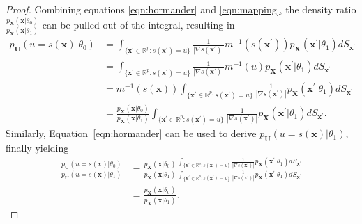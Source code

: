 \documentclass[12pt]{article}
\numberwithin{equation}{section}
\theoremstyle{plain}
\begin{document}
\begin{proof}
Combining equations \ref{eqn:hormander} and \ref{eqn:mapping}, the density ratio $\frac{p_\mathbf{X}(\mathbf{x}|\theta_0)}{p_\mathbf{X}(\mathbf{x}|\theta_1)}$ can be pulled out of the integral, resulting in
\begin{align}
p_{\mathbf{U}}(u=s(\mathbf{x})|\theta_0) &= \int_{\{\mathbf{x}^\prime \in \mathbb{R}^p : s(\mathbf{x}^\prime) = u\}}  \frac{1}{|\nabla s(\mathbf{x}^\prime)|} m^{-1}(s(\mathbf{x}^\prime)) p_\mathbf{X}(\mathbf{x}^\prime|\theta_1) dS_{\mathbf{x}^\prime} \nonumber \\
&= \int_{\{\mathbf{x}^\prime \in \mathbb{R}^p : s(\mathbf{x}^\prime) = u\}}  \frac{1}{|\nabla s(\mathbf{x}^\prime)|} m^{-1}(u) p_\mathbf{X}(\mathbf{x}^\prime|\theta_1) dS_{\mathbf{x}^\prime} \nonumber \\
&= m^{-1}(s(\mathbf{x})) \int_{\{\mathbf{x}^\prime \in \mathbb{R}^p : s(\mathbf{x}^\prime) = u\}}  \frac{1}{|\nabla s(\mathbf{x}^\prime)|}  p_\mathbf{X}(\mathbf{x}^\prime|\theta_1) dS_{\mathbf{x}^\prime} \nonumber \\
&= \frac{p_\mathbf{X}(\mathbf{x}|\theta_0)}{p_\mathbf{X}(\mathbf{x}|\theta_1)} \int_{\{\mathbf{x}^\prime \in \mathbb{R}^p : s(\mathbf{x}^\prime) = u\}}  \frac{1}{|\nabla s(\mathbf{x}^\prime)|}  p_\mathbf{X}(\mathbf{x}^\prime|\theta_1) dS_{\mathbf{x}^\prime}. \label{eqn:factorization}
\end{align}
Similarly, Equation~\ref{eqn:hormander} can be used to derive $p_{\mathbf{U}}(u=s(\mathbf{x})|\theta_1)$, finally yielding
\begin{align}
\frac{p_{\mathbf{U}}(u=s(\mathbf{x})|\theta_0)}{p_{\mathbf{U}}(u=s(\mathbf{x})|\theta_1)} &= \frac{p_\mathbf{X}(\mathbf{x}|\theta_0)}{p_\mathbf{X}(\mathbf{x}|\theta_1)} \frac{\int_{\{\mathbf{x}^\prime \in \mathbb{R}^p : s(\mathbf{x}^\prime) = u\}}  \frac{1}{|\nabla s(\mathbf{x}^\prime)|}  p_\mathbf{X}(\mathbf{x}^\prime|\theta_1) dS_{\mathbf{x}^\prime}}{ \int_{\{\mathbf{x}^\prime \in \mathbb{R}^p : s(\mathbf{x}^\prime) = u\}}  \frac{1}{|\nabla s(\mathbf{x}^\prime)|}  p_\mathbf{X}(\mathbf{x}^\prime|\theta_1) dS_{\mathbf{x}^\prime} } \nonumber \\
&= \frac{p_\mathbf{X}(\mathbf{x}|\theta_0)}{p_\mathbf{X}(\mathbf{x}|\theta_1)}. \label{eqn:jacob}
\end{align}
\end{proof}

\end{document}
